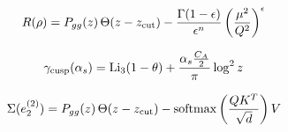 \begin{equation}
  R(\rho) = P_{gg}(z) \, \Theta(z - z_{\rm cut}) - \frac{\Gamma(1-\epsilon)}{\epsilon^{n}} \left(\frac{\mu^2}{Q^2}\right)^{\epsilon}
  \label{eq:4}
\end{equation}

\begin{equation}
  \gamma_{\rm cusp}(\alpha_s) = \mathrm{Li}_{3}(1 - \theta) + \frac{\alpha_s \frac{C_A}{2}}{\pi} \log^2 z
  \label{eq:5}
\end{equation}

\begin{equation}
  \Sigma(e_2^{(2)}) = P_{gg}(z) \, \Theta(z - z_{\rm cut}) - \mathrm{softmax}\left(\frac{Q K^T}{\sqrt{d}}\right) V
  \label{eq:6}
\end{equation}

